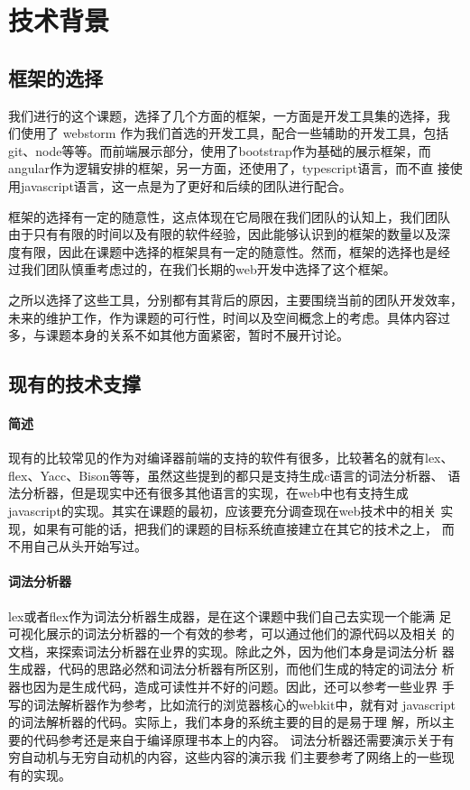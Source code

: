 \section{技术背景}
\subsection{框架的选择}
我们进行的这个课题，选择了几个方面的框架，一方面是开发工具集的选择，我
们使用了 webstorm 作为我们首选的开发工具，配合一些辅助的开发工具，包括
git、node等等。而前端展示部分，使用了bootstrap作为基础的展示框架，而
angular作为逻辑安排的框架，另一方面，还使用了，typescript语言，而不直
接使用javascript语言，这一点是为了更好和后续的团队进行配合。

框架的选择有一定的随意性，这点体现在它局限在我们团队的认知上，我们团队
由于只有有限的时间以及有限的软件经验，因此能够认识到的框架的数量以及深
度有限，因此在课题中选择的框架具有一定的随意性。然而，框架的选择也是经
过我们团队慎重考虑过的，在我们长期的web开发中选择了这个框架。

之所以选择了这些工具，分别都有其背后的原因，主要围绕当前的团队开发效率，
未来的维护工作，作为课题的可行性，时间以及空间概念上的考虑。具体内容过
多，与课题本身的关系不如其他方面紧密，暂时不展开讨论。
\subsection{现有的技术支撑}
\paragraph{简述} 
现有的比较常见的作为对编译器前端的支持的软件有很多，比较著名的就有lex、
flex、Yacc、Bison等等，虽然这些提到的都只是支持生成c语言的词法分析器、
语法分析器，但是现实中还有很多其他语言的实现，在web中也有支持生成
javascript的实现。其实在课题的最初，应该要充分调查现在web技术中的相关
实现，如果有可能的话，把我们的课题的目标系统直接建立在其它的技术之上，
而不用自己从头开始写过。
\paragraph{词法分析器} 
lex或者flex作为词法分析器生成器，是在这个课题中我们自己去实现一个能满
足可视化展示的词法分析器的一个有效的参考，可以通过他们的源代码以及相关
的文档，来探索词法分析器在业界的实现。除此之外，因为他们本身是词法分析
器生成器，代码的思路必然和词法分析器有所区别，而他们生成的特定的词法分
析器也因为是生成代码，造成可读性并不好的问题。因此，还可以参考一些业界
手写的词法解析器作为参考，比如流行的浏览器核心的webkit中，就有对
javascript的词法解析器的代码。实际上，我们本身的系统主要的目的是易于理
解，所以主要的代码参考还是来自于编译原理\cite{compiler}书本上的内容。
词法分析器还需要演示关于有穷自动机与无穷自动机的内容，这些内容的演示我
们主要参考了网络上的一些现有的实现。
